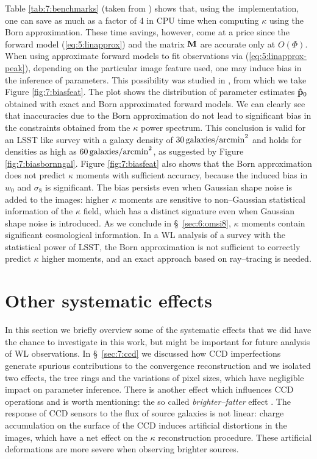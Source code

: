 Table \ref{tab:7:benchmarks} (taken from \citep{PetriBorn}) shows that, using the \LT\,implementation, one can save as much as a factor of 4 in CPU time when computing $\kappa$ using the Born approximation. These time savings, however, come at a price since the forward model (\ref{eq:5:linapprox}) and the matrix $\mathbf{M}$ are accurate only at $O(\Phi)$. When using approximate forward models to fit observations via (\ref{eq:5:linapprox-peak}), depending on the particular image feature used, one may induce bias in the inference of parameters. This possibility was studied in \citep{PetriBorn}, from which we take Figure \ref{fig:7:biasfeat}. The plot shows the distribution of parameter estimates $\mathbf{\hat{p}}_0$ obtained with exact and Born approximated forward models. We can clearly see that inaccuracies due to the Born approximation do not lead to significant bias in the constraints obtained from the $\kappa$ power spectrum. This conclusion is valid for an LSST like survey with a galaxy density of $30\,{\rm galaxies/arcmin}^2$ and holds for densities as high as $60\,{\rm galaxies/arcmin}^2$, as suggested by Figure \ref{fig:7:biasbornngal}. Figure \ref{fig:7:biasfeat} also shows that the Born approximation does not predict $\kappa$ moments with sufficient accuracy, because the induced bias in $w_0$ and $\sigma_8$ is significant. The bias persists even when Gaussian shape noise is added to the images: higher $\kappa$ moments are sensitive to non--Gaussian statistical information of the $\kappa$ field, which has a distinct signature even when Gaussian shape noise is introduced. As we conclude in \S~\ref{sec:6:omsi8}, $\kappa$ moments contain significant cosmological information. In a WL analysis of a survey with the statistical power of LSST, the Born approximation is not sufficient to correctly predict $\kappa$ higher moments, and an exact approach based on ray--tracing is needed. 

\section{Other systematic effects}
In this section we briefly overview some of the systematic effects that we did have the chance to investigate in this work, but might be important for future analysis of WL observations. In \S~\ref{sec:7:ccd} we discussed how CCD imperfections generate spurious contributions to the convergence reconstruction and we isolated two effects, the tree rings and the variations of pixel sizes, which have negligible impact on parameter inference. There is another effect which influences CCD operations and is worth mentioning: the so called \textit{brighter--fatter} effect \citep{BrightFat}. The response of CCD sensors to the flux of source galaxies is not linear: charge accumulation on the surface of the CCD induces artificial distortions in the images, which have a net effect on the $\kappa$ reconstruction procedure. These artificial deformations are more severe when observing brighter sources.

